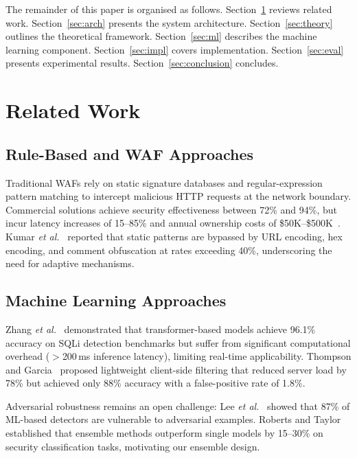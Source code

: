 \documentclass[10pt, twocolumn]{article}
\begin{document}
The remainder of this paper is organised as follows. Section~\ref{sec:related} 
reviews related work. Section~\ref{sec:arch} presents the system architecture. 
Section~\ref{sec:theory} outlines the theoretical framework. 
Section~\ref{sec:ml} describes the machine learning component. 
Section~\ref{sec:impl} covers implementation. Section~\ref{sec:eval} 
presents experimental results. Section~\ref{sec:conclusion} concludes.

\section{Related Work}
\label{sec:related}

\subsection{Rule-Based and WAF Approaches}

Traditional WAFs rely on static signature databases and regular-expression 
pattern matching to intercept malicious HTTP requests at the network boundary. 
Commercial solutions achieve security effectiveness between 72\% and 94\%, but 
incur latency increases of 15--85\% and annual ownership costs of 
\$50K--\$500K~\cite{nsslabs2024}. Kumar \textit{et al.}~\cite{kumar2024} 
reported that static patterns are bypassed by URL encoding, hex encoding, 
and comment obfuscation at rates exceeding 40\%, underscoring the need for 
adaptive mechanisms.

\subsection{Machine Learning Approaches}

Zhang \textit{et al.}~\cite{zhang2024} demonstrated that transformer-based 
models achieve 96.1\% accuracy on SQLi detection benchmarks but suffer from 
significant computational overhead ($>$200\,ms inference latency), limiting 
real-time applicability. Thompson and Garcia~\cite{thompson2024} proposed 
lightweight client-side filtering that reduced server load by 78\% but 
achieved only 88\% accuracy with a false-positive rate of 1.8\%.

Adversarial robustness remains an open challenge: Lee \textit{et al.}~\cite{lee2024} 
showed that 87\% of ML-based detectors are vulnerable to adversarial examples. 
Roberts and Taylor~\cite{roberts2024} established that ensemble methods 
outperform single models by 15--30\% on security classification tasks, 
motivating our ensemble design.
\end{document}
